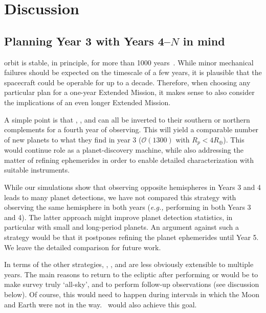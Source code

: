 \section{Discussion} 
\label{sec:discussion}

\subsection{Planning Year 3 with Years 4--$N$ in mind}
\label{sec:gtr_1yr_horizon}

\tesss orbit is stable, in principle, for more than 1000 years~\citep{gangestad_high_2013}.
While minor mechanical failures should be expected on the timescale of a few 
years, it is plausible that the spacecraft could be operable for up to a decade.
Therefore, when choosing any particular plan for a one-year Extended Mission, it makes
sense to also consider the implications of an even longer Extended Mission.

A simple point is that \nhemi, \npole, and \shemiAvoid\:can all be inverted to their southern or northern complements for a fourth year of observing.
This will yield a comparable number of new planets to what they find in year 3 ($\mathcal{O}(1300)$ with $R_p<4R_\oplus$).
This would continue \tesss role as a planet-discovery machine, while also 
addressing the matter of refining ephemerides in order to enable detailed 
characterization with suitable instruments.

While our simulations show that observing opposite hemispheres in Years 3 and 4 
leads to many planet detections, we have not compared this strategy with 
observing the same hemisphere in both years (\textit{e.g.,} performing 
\nhemi\:in both Years 3 and 4). The latter approach might improve planet 
detection statistics, in particular with small and long-period planets.
An argument against such a strategy would be that it postpones refining 
the \tess planet ephemerides until Year 5.
We leave the detailed comparison for future work. 

In terms of the other strategies, \elong, \eshort, and \hemis\:are less 
obviously extensible to multiple years.
The main reasons to return to the ecliptic after performing \elong\:or 
\eshort\:would be to make \tesss survey truly `all-sky', and to perform \ktwo 
follow-up observations (see discussion below).
Of course, this would need to happen during intervals in which the Moon and 
Earth were not in the way.
\shemiAvoid\ would also achieve this goal.

